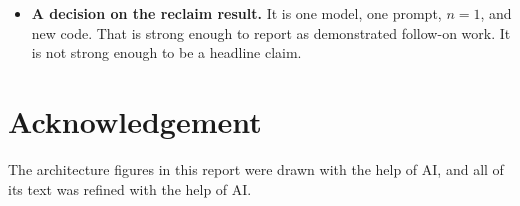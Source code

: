 \documentclass[11pt]{article}
\begin{document}
\begin{itemize}
\textbf{A reinforcement learning fit.} The reward is directly measurable on the phone. State:
remaining charge, DDR and skin temperature, prompt length, and the prefill attention statistic
the $\alpha$-gate already computes. Action: one budget tier. Reward: quality-weighted tokens
per mWh across the episode. The coulomb counter supplies the energy term at 2\,Hz and the
existing scoring harness supplies the quality term offline.

\textbf{What would make it fail.} An action's effect is delayed and confounded by temperature,
so credit assignment is hard, and a policy trained on one handset may not transfer to another.
Both are testable with the campaign structure already built here: the question is whether a
learned policy beats a fixed $K{=}1024$ on tokens per mWh at matched quality.

\item \textbf{A decision on the reclaim result.} It is one model, one prompt, $n{=}1$, and new
code. That is strong enough to report as demonstrated follow-on work. It is not strong enough
to be a headline claim.
\end{itemize}

\section*{Acknowledgement}
The architecture figures in this report were drawn with the help of AI, and all of its text was refined with the help of AI.
\end{document}
